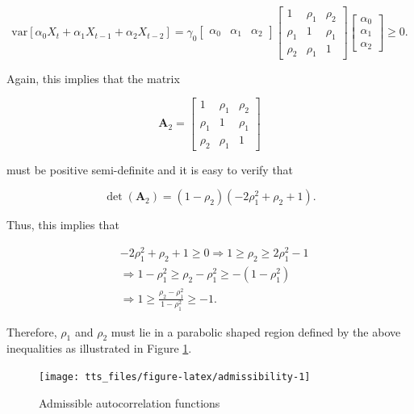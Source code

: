 \documentclass[]{book}
\theoremstyle{definition}
\theoremstyle{definition}
\theoremstyle{definition}
\theoremstyle{remark}
\begin{document}
\[\text{var} \left[ \alpha_0 X_{t} + \alpha_1 X_{t-1}  + \alpha_2 X_{t-2} \right] = \gamma_0 \begin{bmatrix}
     \alpha_0 & \alpha_1 &\alpha_2
     \end{bmatrix}   \begin{bmatrix}
     1 & \rho_1 & \rho_2\\
     \rho_1 & 1 & \rho_1 \\
     \rho_2 & \rho_1 & 1
     \end{bmatrix} \begin{bmatrix}
     \alpha_0 \\
     \alpha_1 \\
     \alpha_2
     \end{bmatrix} \geq 0. \]

Again, this implies that the matrix

\[ \boldsymbol{A}_2 = \begin{bmatrix}
  1 & \rho_1 & \rho_2\\
  \rho_1 & 1 & \rho_1 \\
  \rho_2 & \rho_1 & 1
  \end{bmatrix} \]

must be positive semi-definite and it is easy to verify that

\[\operatorname{det} \left(\boldsymbol{A}_2\right) = \left(1 - \rho_2 \right)\left(- 2 \rho_1^2 + \rho_2 + 1\right). \]

Thus, this implies that

\[\begin{aligned} &- 2 \rho_1^2 + \rho_2 + 1 \geq 0 \Rightarrow 1 \geq \rho_2 \geq 2 \rho_1^2 - 1 \\
   &\Rightarrow 1 - \rho_1^2 \geq \rho_2 - \rho_1^2 \geq -(1 - \rho_1^2)\\
   &\Rightarrow 1 \geq \frac{\rho_2 - \rho_1^2 }{1 - \rho_1^2} \geq -1.
   \end{aligned}\]

Therefore, \(\rho_1\) and \(\rho_2\) must lie in a parabolic shaped
region defined by the above inequalities as illustrated in Figure
\ref{fig:admissibility}.

\begin{figure}

{\centering \texttt{[image: tts\_files/figure-latex/admissibility-1]} 

}

\caption{Admissible autocorrelation functions}\label{fig:admissibility}
\end{figure}
\end{document}
